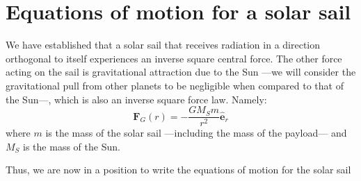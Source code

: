 \documentclass[twocolumn,12pt,a4paper]{article}
\numberwithin{equation}{section}
\begin{document}
\section{Equations of motion for a solar sail}
We have established that a solar sail that receives radiation in a direction orthogonal to itself experiences an inverse square central force. The other force acting on the sail is gravitational attraction due to the Sun ---we will consider the gravitational pull from other planets to be negligible when compared to that of the Sun---, which is also an inverse square force law. Namely:
\begin{equation}
 	\mathbf{F}_G(r) = -\dfrac{G M_S m}{r^2} \mathbf{\hat{e}}_r \label{eq:gravitational force}
\end{equation}
where \( m \) is the mass of the solar sail ---including the mass of the payload--- and \( M_S \) is the mass of the Sun.

Thus, we are now in a position to write the equations of motion for the solar sail
\begin{equation}
  \begin{aligned}
    
  \end{aligned}
\end{equation}
\end{document}
